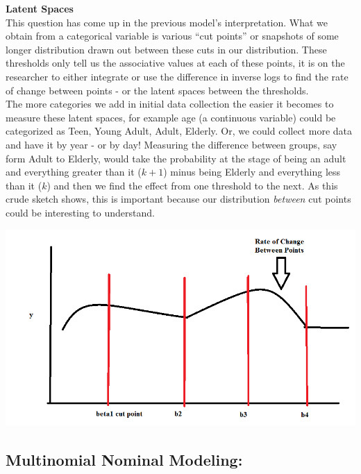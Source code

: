\documentclass[12pt]{article}\usepackage[]{graphicx}\usepackage[]{color}
\begin{document}
\begin{flushleft}
\clearpage
\noindent \textbf{Latent Spaces}\\
This question has come up in the previous model's interpretation. What we obtain from a categorical variable is various ``cut points'' or snapshots of some longer distribution drawn out between these cuts in our distribution. These thresholds only tell us the associative values at each of these points, it is on the researcher to either integrate or use the difference in inverse logs to find the rate of change between points - or the latent spaces between the thresholds. \\
The more categories we add in initial data collection the easier it becomes to measure these latent spaces, for example age (a continuous variable) could be categorized as Teen, Young Adult, Adult, Elderly. Or, we could collect more data and have it by year - or by day! Measuring the difference between groups, say form Adult to Elderly, would take the probability at the stage of being an adult and everything greater than it ($k+1$) minus being Elderly and everything less than it ($k$) and then we find the effect from one threshold to the next. As this crude sketch shows, this is important because our distribution \textit{between} cut points could be interesting to understand.\\

\begin{center}
\includegraphics[scale=.65]{yeah}
\end{center}














\clearpage
\subsection{Multinomial Nominal Modeling:}


\end{flushleft}
\end{document}
